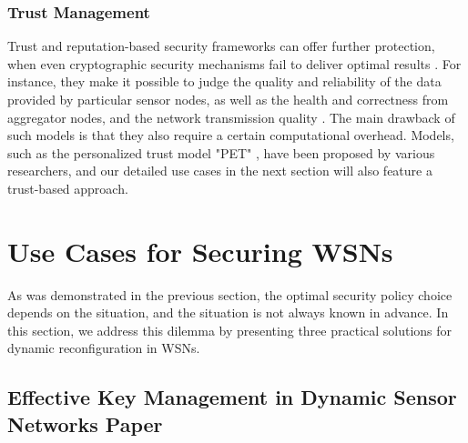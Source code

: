 \documentclass[12pt,a4paper,twoside]{report}
\begin{document}
\subsubsection{Trust Management}
Trust and reputation-based security frameworks can offer further protection, when even cryptographic security mechanisms fail to deliver optimal results \cite{sen:2009}. For instance, they make it possible to judge the quality and reliability of the data provided by particular sensor nodes, as well as the health and correctness from  aggregator nodes, and the network transmission quality \cite{sen:2009}. The main drawback of such models is that they also require a certain computational overhead. Models, such as the personalized trust model "PET" \cite{liang;shi:2005}, have been proposed by various researchers, and our detailed use cases in the next section will also feature a trust-based approach.\par









\section{Use Cases for Securing WSNs}
As was demonstrated in the previous section, the optimal security policy choice depends on the situation, and the situation is not always known in advance. In this section, we address this dilemma by presenting three practical solutions for dynamic reconfiguration in WSNs. 

\subsection{Effective Key Management in Dynamic Sensor Networks Paper}
\end{document}
